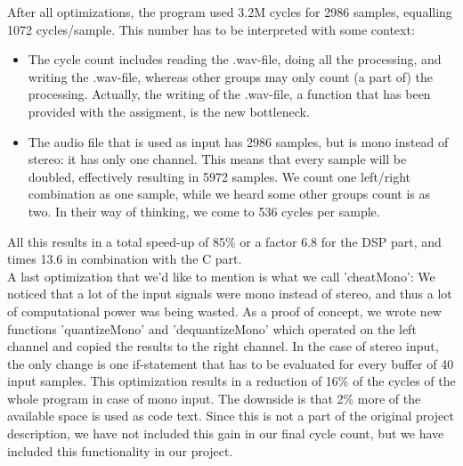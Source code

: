 \documentclass[a4paper]{article}
\begin{document}
After all optimizations, the program used 3.2M cycles for 2986 samples, equalling 1072 cycles/sample. This number has to be interpreted with some context:
\begin{itemize}
\item The cycle count includes reading the .wav-file, doing all the processing, and writing the .wav-file, whereas other groups may only count (a part of) the processing. Actually, the writing of the .wav-file, a function that has been provided with the assigment, is the new bottleneck.
\item The audio file that is used as input has 2986 samples, but is mono instead of stereo: it has only one channel. This means that every sample will be doubled, effectively resulting in 5972 samples. We count one left/right combination as one sample, while we heard some other groups count is as two. In their way of thinking, we come to 536 cycles per sample.
\end{itemize}
All this results in a total speed-up of 85\% or a factor 6.8 for the DSP part, and times 13.6 in combination with the C part.\\

A last optimization that we'd like to mention is what we call 'cheatMono': We noticed that a lot of the input signals were mono instead of stereo, and thus a lot of computational power was being wasted. As a proof of concept, we wrote new functions 'quantizeMono' and 'dequantizeMono' which operated on the left channel and copied the results to the right channel. In the case of stereo input, the only change is one if-statement that has to be evaluated for every buffer of 40 input samples. This optimization results in a reduction of 16\% of the cycles of the whole program in case of mono input. The downside is that 2\% more of the available space is used as code text. Since this is not a part of the original project description, we have not included this gain in our final cycle count, but we have included this functionality in our project. 
\end{document}
